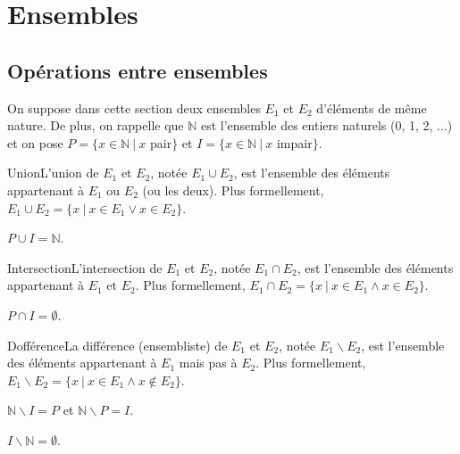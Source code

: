 \section{Ensembles}

\subsection{Opérations entre ensembles}

On suppose dans cette section deux ensembles $E_1$ et $E_2$ d'éléments de même nature. De plus, on rappelle que $\mathbb{N}$ est l'ensemble des entiers naturels (0, 1, 2, ...) et on pose $P = \{x \in \mathbb{N} ~|~ x$ pair$\}$ et $I = \{x \in \mathbb{N}~|~ x$ impair$\}$.

\begin{definition}{Union}{}L'union de $E_1$ et $E_2$, notée $E_1 \cup E_2$, est l'ensemble des éléments appartenant à $E_1$ ou $E_2$ (ou les deux). Plus formellement, $E_1 \cup E_2 = \{x ~|~ x \in E_1 \vee x \in E_2\}$.
\end{definition}

\begin{example}
$P \cup I = \mathbb{N}$.
\end{example}

\begin{definition}{Intersection}{}L'intersection de $E_1$ et $E_2$, notée $E_1 \cap E_2$, est l'ensemble des éléments appartenant à $E_1$ et $E_2$. Plus formellement, $E_1 \cap E_2 = \{x ~|~ x \in E_1 \wedge x \in E_2\}$.
\end{definition}

\begin{example}
$P \cap I = \emptyset$.
\end{example}


\begin{definition}{Dofférence}{}La différence (ensembliste) de $E_1$ et $E_2$, notée $E_1 \backslash E_2$, est l'ensemble des éléments appartenant à $E_1$ mais pas à $E_2$. Plus formellement, $E_1 \backslash E_2 = \{x ~|~ x \in E_1 \wedge x \notin E_2\}$.
\end{definition}

\begin{example}
$\mathbb{N} \backslash I = P$ et $\mathbb{N} \backslash P = I$.
\end{example}

\begin{example}
$I \backslash \mathbb{N} = \emptyset$.
\end{example}

